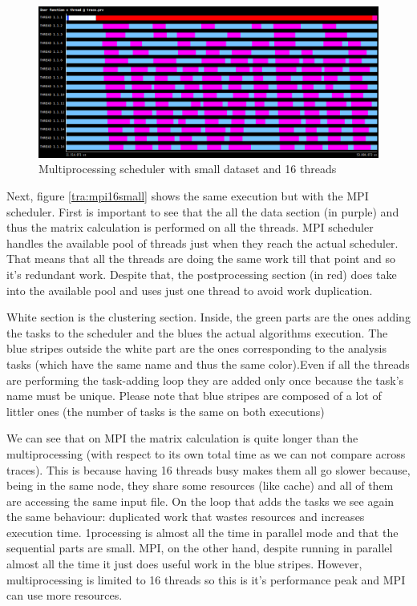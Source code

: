 \begin{figure}[h]
\includegraphics[width=\textwidth]{traces/par_16_small.png}
\caption{Multiprocessing scheduler with small dataset and 16 threads}
\label{tra:par16small}
\end{figure}

Next, figure \ref{tra:mpi16small} shows the same execution but with the MPI scheduler. First is important to see that the all the data section (in purple) and thus the matrix calculation is performed on all the threads. MPI scheduler handles the available pool of threads just when they reach the actual scheduler. That means that all the threads are doing the same work till that point and so it's redundant work. Despite that, the postprocessing section (in red) does take into the available pool and uses just one thread to avoid work duplication. 

White section is the clustering section. Inside, the green parts are the ones adding the tasks to the scheduler and the blues the actual algorithms execution. The blue stripes outside the white part are the ones corresponding to the analysis tasks (which have the same name and thus the same color).Even if all the threads are performing the task-adding loop they are added only once because the task's name must be unique. Please note that blue stripes are composed of a lot of littler ones (the number of tasks is the same on both executions)  

We can see that on MPI the matrix calculation is quite longer than the multiprocessing (with respect to its own total time as we can not compare across traces). This is because having 16 threads busy makes them all go slower because, being in the same node, they share some resources (like cache) and all of them are accessing the same input file. On the loop that adds the tasks we see again the same behaviour: duplicated work that wastes resources and increases execution time. 
1processing is almost all the time in parallel mode and that the sequential parts are small. MPI, on the other hand, despite running in parallel almost all the time it just does useful work in the blue stripes. However, multiprocessing is limited to 16 threads so this is it's performance peak and MPI can use more resources.

